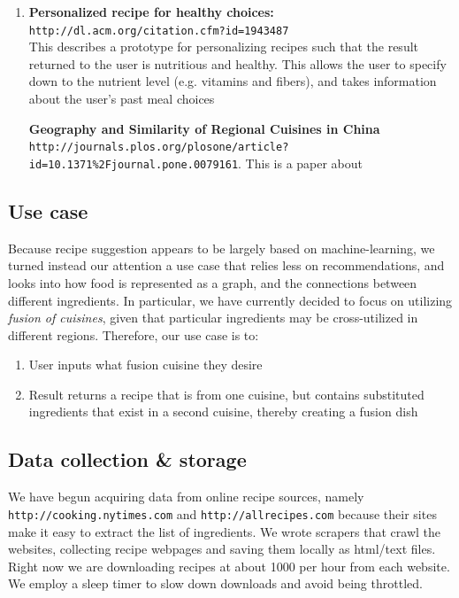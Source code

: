 \documentclass{article}
\begin{document}
\begin{enumerate}
    \item
    \textbf{Personalized recipe for healthy choices:} \texttt{http://dl.acm.org/citation.cfm?id=1943487} \\
    This describes a prototype for personalizing recipes such that the result returned to the user
    is nutritious and healthy. This allows the user to specify down to the nutrient level (e.g. vitamins and fibers),
    and takes information about the user's past meal choices 
    
    \textbf{Geography and Similarity of Regional Cuisines in China} \\
    \texttt{http://journals.plos.org/plosone/article?id=10.1371\%2Fjournal.pone.0079161}.
    This is a paper about
    
\end{enumerate}

\subsection{Use case} 
Because recipe suggestion appears to be largely based on machine-learning, we turned instead
our attention a use case that relies less on recommendations, and looks into how 
food is represented as a graph, and the connections between different ingredients. In particular,
we have currently decided to focus on utilizing \textit{fusion of cuisines}, given that
particular ingredients may be cross-utilized in different regions. Therefore, our use case is to:
\begin{enumerate}
    \item User inputs what fusion cuisine they desire 
    \item Result returns a recipe that is from one cuisine, but contains substituted ingredients that 
        exist in a second cuisine, thereby creating a fusion dish 
\end{enumerate}


\subsection{Data collection \& storage} 
We have begun acquiring data from online recipe sources, namely \texttt{http://cooking.nytimes.com} and \texttt{http://allrecipes.com} because their sites make it easy to extract the list of ingredients. We wrote scrapers that crawl the websites, collecting recipe webpages and saving them locally as html/text files. Right now we are downloading recipes at about 1000 per hour from each website. We employ a sleep timer to slow down downloads and avoid being throttled.
\end{document}

